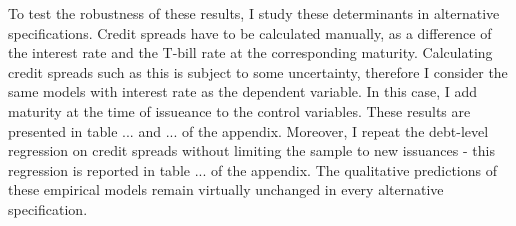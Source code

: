 \documentclass[12pt]{article}
\begin{document}
\noindent To test the robustness of these results, I study these determinants in alternative specifications. Credit spreads have to be calculated manually, as a difference of the interest rate and the T-bill rate at the corresponding maturity. Calculating credit spreads such as this is subject to some uncertainty, therefore I consider the same models with interest rate as the dependent variable. In this case, I add maturity at the time of issueance to the control variables. These results are presented in table ... and ... of the appendix. Moreover, I repeat the debt-level regression on credit spreads without limiting the sample to new issuances - this regression is reported in table ... of the appendix. The qualitative predictions of these empirical models remain virtually unchanged in every alternative specification.
\end{document}
